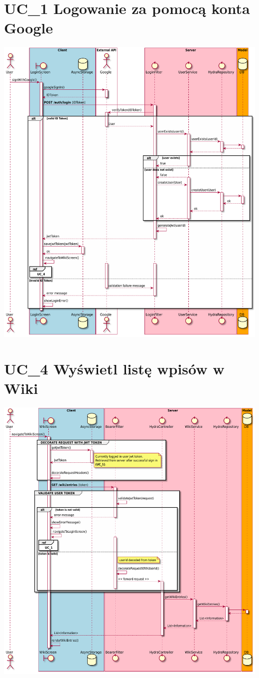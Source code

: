 \documentclass[oneside]{scrreprt}
\begin{document}
\section{UC\_1 Logowanie za pomocą konta Google}
\includegraphics[width=\textwidth, keepaspectratio]{graphics/sequence_diagram_login.pdf}

\section{UC\_4 Wyświetl listę wpisów w Wiki}
\includegraphics[width=\textwidth, keepaspectratio]{graphics/sequence_diagram_wiki_list.pdf}
\end{document}
